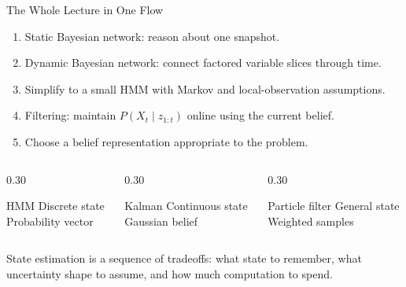 \documentclass[aspectratio=169,10pt]{beamer}
\begin{document}
\begin{frame}[shrink=10]{The Whole Lecture in One Flow}
  \begin{enumerate}
    \item Static Bayesian network: reason about one snapshot.
    \item Dynamic Bayesian network: connect factored variable slices through time.
    \item Simplify to a small HMM with Markov and local-observation assumptions.
    \item Filtering: maintain $P(X_t\mid z_{1:t})$ online using the current belief.
    \item Choose a belief representation appropriate to the problem.
  \end{enumerate}

  \begin{columns}[T,onlytextwidth]
    \begin{column}{0.30\textwidth}
      \begin{block}{HMM}
        \centering Discrete state\\Probability vector
      \end{block}
    \end{column}
    \begin{column}{0.30\textwidth}
      \begin{block}{Kalman}
        \centering Continuous state\\Gaussian belief
      \end{block}
    \end{column}
    \begin{column}{0.30\textwidth}
      \begin{block}{Particle filter}
        \centering General state\\Weighted samples
      \end{block}
    \end{column}
  \end{columns}

  \begin{keyidea}
    State estimation is a sequence of tradeoffs: what state to remember, what uncertainty shape to assume, and how much computation to spend.
  \end{keyidea}
\end{frame}
\end{document}
